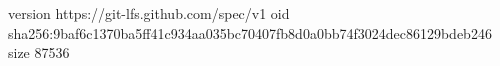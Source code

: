 version https://git-lfs.github.com/spec/v1
oid sha256:9baf6c1370ba5ff41c934aa035bc70407fb8d0a0bb74f3024dec86129bdeb246
size 87536
